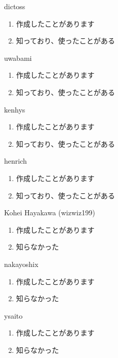 \begin{prework}{ dictoss }
  \begin{enumerate}
  \item 作成したことがあります
  \item 知っており、使ったことがある
  \end{enumerate}
\end{prework}

\begin{prework}{ uwabami }
  \begin{enumerate}
  \item 作成したことがあります
  \item 知っており、使ったことがある
  \end{enumerate}
\end{prework}

\begin{prework}{ kenhys }
  \begin{enumerate}
  \item 作成したことがあります
  \item 知っており、使ったことがある
  \end{enumerate}
\end{prework}

\begin{prework}{ henrich }
  \begin{enumerate}
  \item 作成したことがあります
  \item 知っており、使ったことがある
  \end{enumerate}
\end{prework}

\begin{prework}{ Kohei Hayakawa (wizwiz199) }
  \begin{enumerate}
  \item 作成したことがあります
  \item 知らなかった
  \end{enumerate}
\end{prework}

\begin{prework}{ nakayoshix }
  \begin{enumerate}
  \item 作成したことがあります
  \item 知らなかった
  \end{enumerate}
\end{prework}

\begin{prework}{ ysaito }
  \begin{enumerate}
  \item 作成したことがあります
  \item 知らなかった
  \end{enumerate}
\end{prework}


